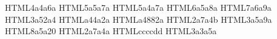 \definecolor{cSet}    {HTML}{4a4a6a}
\definecolor{cBinop}  {HTML}{5a5a7a}
\definecolor{cMagma}  {HTML}{5a4a7a}
\definecolor{cSemi}   {HTML}{6a5a8a}
\definecolor{cMonoid} {HTML}{7a6a9a}
\definecolor{cGroup}  {HTML}{3a52a4}
\definecolor{cRing}   {HTML}{a44a2a}
\definecolor{cField}  {HTML}{a4882a}
\definecolor{cVS}     {HTML}{2a7a4b}
\definecolor{arrISA}  {HTML}{3a5a9a}
\definecolor{arrHASA} {HTML}{8a5a20}
\definecolor{arrUSES} {HTML}{2a7a4a}
\definecolor{sigtext} {HTML}{ccccdd}
\definecolor{lbltext} {HTML}{3a3a5a}
